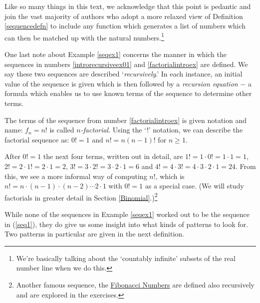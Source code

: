 Like so many things in this text, we acknowledge that this point is pedantic and join the vast majority of authors who adopt a more relaxed view of Definition \ref{sequencedefn} to include any function which generates a list of numbers which can then be matched up with the natural numbers.\footnote{We're basically talking about the `countably infinite' subsets of the real number line when we do this.}   


 One last note about Example \ref{seqex1} concerns the manner in which the sequences in numbers  \ref {introrecursiveex01} and \ref{factorialintroex} are defined.  We say these two sequences are  described  `\textit{recursively}.'  In each instance, an initial value of the sequence is given which is then followed by a  \textit{recursion equation} $-$ a formula which enables us to use known terms of the sequence to determine other terms.  
 
 The terms of the sequence from number  \ref{factorialintroex} is given notation and name:  $f_{n}=n!$ is called  \textit{$n$-factorial}.  Using the `!' notation, we can describe the factorial sequence as: $0! = 1$ and $n! = n(n-1)!$ for $n \geq 1$. 
 
 After $0! = 1$ the next four terms, written out in detail, are $1! = 1 \cdot 0! = 1 \cdot 1 = 1$, $2! = 2 \cdot 1! = 2 \cdot 1 = 2$, $3! = 3 \cdot 2! = 3 \cdot 2 \cdot 1 = 6$ and  $4! = 4 \cdot 3! = 4 \cdot 3 \cdot 2 \cdot 1 = 24$.  From this, we see a more informal way of computing  $n!$, which is $n! = n\cdot(n -1)\cdot(n -2) \cdots 2 \cdot 1$ with $0! = 1$ as a special case.  (We will study factorials in greater detail in Section \ref{Binomial}.)\footnote{Another  famous sequence, the \href{http://en.wikipedia.org/wiki/Fibonacci_number}{\underline{Fibonacci Numbers}} are defined also recursively and are explored in the exercises.}  
 
 While none of the sequences in Example \ref{seqex1} worked out to be the sequence in (\ref{seq1}), they do give us some insight into what kinds of patterns to look for.  Two patterns in particular are given in the next definition.

\smallskip

